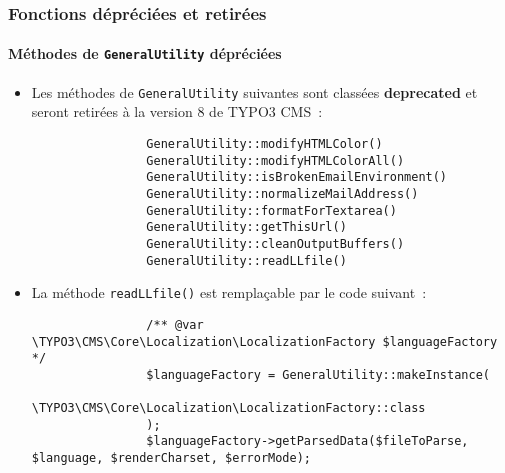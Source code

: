 
\begin{frame}[fragile]
	\frametitle{Fonctions dépréciées et retirées}
	\framesubtitle{Méthodes de \texttt{GeneralUtility} dépréciées}

	\lstset{basicstyle=\tiny\ttfamily}

	\begin{itemize}
		\item Les méthodes de \texttt{GeneralUtility} suivantes sont classées \textbf{deprecated}
			et seront retirées à la version 8 de TYPO3 CMS~:

			\begin{lstlisting}
				GeneralUtility::modifyHTMLColor()
				GeneralUtility::modifyHTMLColorAll()
				GeneralUtility::isBrokenEmailEnvironment()
				GeneralUtility::normalizeMailAddress()
				GeneralUtility::formatForTextarea()
				GeneralUtility::getThisUrl()
				GeneralUtility::cleanOutputBuffers()
				GeneralUtility::readLLfile()
			\end{lstlisting}

		\item La méthode \texttt{readLLfile()} est remplaçable par le code suivant~:

			\begin{lstlisting}
				/** @var \TYPO3\CMS\Core\Localization\LocalizationFactory $languageFactory */
				$languageFactory = GeneralUtility::makeInstance(
				  \TYPO3\CMS\Core\Localization\LocalizationFactory::class
				);
				$languageFactory->getParsedData($fileToParse, $language, $renderCharset, $errorMode);
			\end{lstlisting}

	\end{itemize}

\end{frame}

